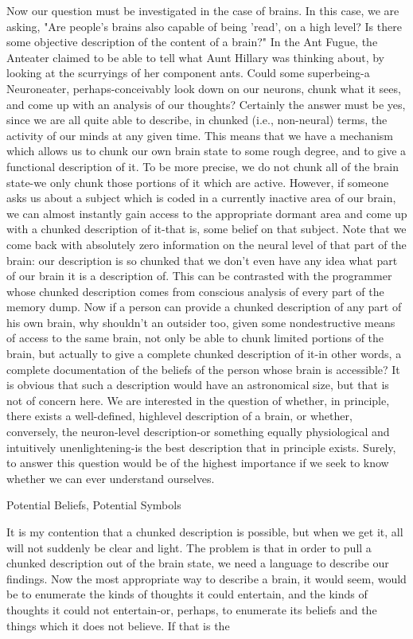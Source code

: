 Now our question must be investigated in the case of brains. In this case, we are asking,
"Are people's brains also capable of being 'read', on a high level? Is there some objective
description of the content of a brain?" In the Ant Fugue, the Anteater claimed to be able
to tell what Aunt Hillary was thinking about, by looking at the scurryings of her
component ants. Could some superbeing-a Neuroneater, perhaps-conceivably look down
on our neurons, chunk what it sees, and come up with an analysis of our thoughts?
        Certainly the answer must be yes, since we are all quite able to describe, in
chunked (i.e., non-neural) terms, the activity of our minds at any given time. This means
that we have a mechanism which allows us to chunk our own brain state to some rough
degree, and to give a functional description of it. To be more precise, we do not chunk all
of the brain state-we only chunk those portions of it which are active. However, if
someone asks us about a subject which is coded in a currently inactive area of our brain,
we can almost instantly gain access to the appropriate dormant area and come up with a
chunked description of it-that is, some belief on that subject. Note that we come back
with absolutely zero information on the neural level of that part of the brain: our
description is so chunked that we don't even have any idea what part of our brain it is a
description of. This can be contrasted with the programmer whose chunked description
comes from conscious analysis of every part of the memory dump.
        Now if a person can provide a chunked description of any part of his own brain,
why shouldn't an outsider too, given some nondestructive means of access to the same
brain, not only be able to chunk limited portions of the brain, but actually to give a
complete chunked description of it-in other words, a complete documentation of the
beliefs of the person whose brain is accessible? It is obvious that such a description
would have an astronomical size, but that is not of concern here. We are interested in the
question of whether, in principle, there exists a well-defined, highlevel description of a
brain, or whether, conversely, the neuron-level description-or something equally
physiological and intuitively unenlightening-is the best description that in principle
exists. Surely, to answer this question would be of the highest importance if we seek to
know whether we can ever understand ourselves.

Potential Beliefs, Potential Symbols

It is my contention that a chunked description is possible, but when we get it, all will not
suddenly be clear and light. The problem is that in order to pull a chunked description out
of the brain state, we need a language to describe our findings. Now the most appropriate
way to describe a brain, it would seem, would be to enumerate the kinds of thoughts it
could entertain, and the kinds of thoughts it could not entertain-or, perhaps, to enumerate
its beliefs and the things which it does not believe. If that is the





